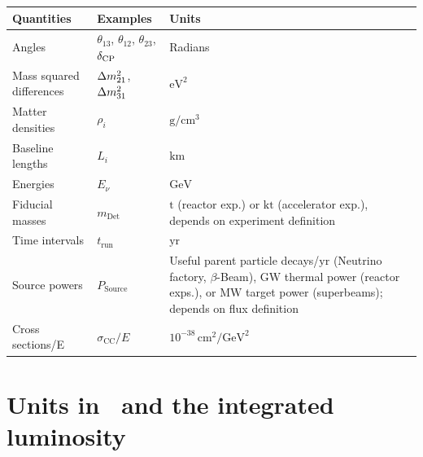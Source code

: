 \begin{table}[tb]
\begin{center}
\begin{tabular}{llp{7cm}}
\hline
Quantities & Examples & Units \\
\hline
Angles & $\theta_{13}$, $\theta_{12}$, $\theta_{23}$, $\delta_{\mathrm{CP}}$ & Radians  \\
Mass squared differences & $\Delta m_{21}^2$, $\Delta m_{31}^2$ & $\mathrm{eV}^2$ \\
Matter densities & $\rho_i$ & $\mathrm{g}/\mathrm{cm}^3$ \\
Baseline lengths & $L_i$ & $\mathrm{km}$ \\
Energies & $E_\nu$ & $\mathrm{GeV}$ \\  
Fiducial masses & $m_{\mathrm{Det}}$ & $\mathrm{t}$ (reactor exp.) or $\mathrm{kt}$ (accelerator exp.), \newline  depends on experiment definition \\
Time intervals & $t_{\mathrm{run}}$ & $\mathrm{yr}$ \\
Source powers & $P_{\mathrm{Source}}$ & Useful parent particle decays/$\mathrm{yr}$ \newline (Neutrino factory, $\beta$-Beam), \newline $\mathrm{GW}$ thermal power (reactor exps.), \newline or
$\mathrm{MW}$ target power (superbeams); \newline
depends on flux definition
 \\
Cross sections/E & $\sigma_{\mathrm{CC}}/E$ & $10^{-38} \, \mathrm{cm^2}/\mathrm{GeV^2}$ \\
\hline
\end{tabular}
\end{center}
\end{table}

\section{Units in \GLOBES\ and the integrated luminosity}
\label{sec:luminosity}
  

